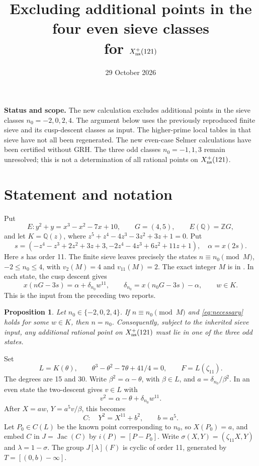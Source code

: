 \documentclass[11pt]{article}
\title{Excluding additional points in the four even sieve classes\\
for \(X_{\rm ns}^+(121)\)}
\author{}\date{29 October 2026}
\newcommand{\Q}{\mathbb Q}\newcommand{\F}{\mathbb F}
\newcommand{\Z}{\mathbb Z}\newcommand{\OO}{\mathcal O}
\newtheorem{proposition}{Proposition}
\begin{document}
\maketitle
\noindent\textbf{Status and scope.}
The new calculation excludes additional points in the sieve classes
\(n_0=-2,0,2,4\). The argument below uses the previously reproduced finite
sieve and its cusp-descent classes as input. The higher-prime local tables
in that sieve have not all been regenerated. The new even-case Selmer
calculations have been certified without GRH. The three odd classes
\(n_0=-1,1,3\) remain unresolved; this is not a determination of all
rational points on \(X_{\rm ns}^+(121)\).

\section{Statement and notation}
Put
\[
 E:y^2+y=x^3-x^2-7x+10,\qquad G=(4,5),\qquad E(\Q)=\Z G,
\]
and let \(K=\Q(z)\), where
\(z^5+z^4-4z^3-3z^2+3z+1=0\). Put
\[
 s=(-z^4-z^3+2z^2+3z+3,-2z^4-4z^3+6z^2+11z+1),
 \quad \alpha=x(2s).
\]
Here \(s\) has order 11. The finite sieve leaves precisely the states
\(n\equiv n_0\pmod M\), \(-2\le n_0\le4\), with
\(v_2(M)=4\) and \(v_{11}(M)=2\). The exact integer \(M\) is in
. In each state, the cusp descent gives
\begin{equation}\label{eq:necessary}
 x(nG-3s)=\alpha+\delta_{n_0}w^{11},\qquad
 \delta_{n_0}=x(n_0G-3s)-\alpha,\qquad w\in K.
\end{equation}
This is the input from the preceding two reports.

\begin{proposition}\label{prop:main}
Let \(n_0\in\{-2,0,2,4\}\). If \(n\equiv n_0\pmod M\) and
\eqref{eq:necessary} holds for some \(w\in K\), then \(n=n_0\).
Consequently, subject to the inherited sieve input, any additional rational
point on \(X_{\rm ns}^+(121)\) must lie in one of the three odd states.
\end{proposition}

Set
\[
 L=K(\theta),\qquad \theta^3-\theta^2-7\theta+41/4=0,
 \qquad F=L(\zeta_{11}).
\]
The degrees are 15 and 30. Write \(\beta^2=\alpha-\theta\), with
\(\beta\in L\), and \(a=\delta_{n_0}/\beta^2\). In an even state the
two-descent gives \(v\in L\) with
\[
 v^2=\alpha-\theta+\delta_{n_0}w^{11}.
\]
After \(X=aw\), \(Y=a^5v/\beta\), this becomes
\begin{equation}\label{eq:C}
 C:\quad Y^2=X^{11}+b^2,\qquad b=a^5.
\end{equation}
Let \(P_0\in C(L)\) be the known point corresponding to \(n_0\), so
\(X(P_0)=a\), and embed \(C\) in \(J=\operatorname{Jac}(C)\) by
\(i(P)=[P-P_0]\). Write \(\sigma(X,Y)=(\zeta_{11}X,Y)\) and
\(\lambda=1-\sigma\). The group \(J[\lambda](F)\) is cyclic of order
11, generated by \(T=[(0,b)-\infty]\).
\end{document}
